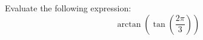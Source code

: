\documentclass{ximera}
\author{David Kish}
\begin{document}
\begin{exercise}
Evaluate the following expression:
\[
\arctan(\tan(\frac{2\pi}{3}))
\]
\begin{multipleChoice}
\end{multipleChoice}
\end{exercise}
\end{document}
